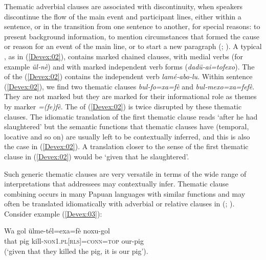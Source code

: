 \documentclass[output=paper]{LSP/langsci}
\begin{document}
Thematic adverbial clauses are associated with discontinuity, when speakers discontinue the flow of the main event and participant lines, either within a sentence, or in the transition from one sentence to another, for special reasons: to present background information, to mention circumstances that formed the cause or reason for an event of the main line, or to start a new paragraph (\citealt[][337, 363]{farr99}; \citealt[][373]{devries.2005}). A typical  , as in (\ref{Devex:02}), contains  marked chained clauses, with medial verbs (for example \textit{ül‑nè}) and with  marked independent verb forms (\textit{dadü-ai=tofexo}). The  of the  (\ref{Devex:02}) contains the independent verb \textit{lamé‑abo‑lu}. Within  sentence  (\ref{Devex:02}), we find two thematic clauses \textit{bul‑fo=xa=fè} and \textit{bul‑mexo=xa=fefè}. They are not  marked but they are marked for their informational role as themes by  marker \textit{=(fe)fè}. The  of (\ref{Devex:02}) is twice disrupted by these thematic clauses. The idiomatic translation of the first thematic clause reads ‘after he had slaughtered’ but the semantic functions that thematic clauses have (temporal, locative and so on) are usually left to be contextually inferred, and this is also the case in (\ref{Devex:02}). A translation closer to the sense of the first thematic clause in (\ref{Devex:02}) would be `given that he slaughtered'. 

Such generic thematic clauses are very versatile in terms of the wide range of interpretations that addressees may contextually infer. Thematic clause combining occurs in many Papuan languages with similar functions and may often be translated idiomatically with adverbial or relative clauses in  (\citealt{haiman.1978,reesink94,Heeschen98}; \citealt[][201]{foley86}). Consider example (\ref{Devex:03}):

\begin{exe}
\ex \label{Devex:03}
\gll Wa gol ülme-tél=exa=fè noxu-gol\\	
that pig  kill-\textsc{non1.pl}[\textsc{rls}]=\textsc{conn}=\textsc{top} our-pig\\
\glt {} (`given that they killed the pig, it is our pig').\\
\end{exe}
\end{document}
